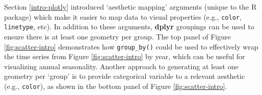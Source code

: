 \documentclass[
  12pt,
]{krantz}
\newenvironment{Shaded}{\begin{snugshade}}{\end{snugshade}}
\newcommand{\CommentTok}[1]{\textcolor[rgb]{0.56,0.35,0.01}{\textit{#1}}}
\newcommand{\DataTypeTok}[1]{\textcolor[rgb]{0.13,0.29,0.53}{#1}}
\newcommand{\KeywordTok}[1]{\textcolor[rgb]{0.13,0.29,0.53}{\textbf{#1}}}
\newcommand{\NormalTok}[1]{#1}
\newcommand{\OperatorTok}[1]{\textcolor[rgb]{0.81,0.36,0.00}{\textbf{#1}}}
\newcommand{\StringTok}[1]{\textcolor[rgb]{0.31,0.60,0.02}{#1}}
\begin{document}
Section \ref{intro-plotly} introduced `aesthetic mapping' arguments (unique to the R package) which make it easier to map data to visual properties (e.g., \texttt{color}, \texttt{linetype}, etc). In addition to these arguments, \textbf{dplyr} groupings can be used to ensure there is at least one geometry per group. The top panel of Figure \ref{fig:scatter-intro} demonstrates how \texttt{group\_by()} could be used to effectively wrap the time series from Figure \ref{fig:scatter-intro} by year, which can be useful for visualizing annual seasonality. Another approach to generating at least one geometry per `group' is to provide categorical variable to a relevant aesthetic (e.g., \texttt{color}), as shown in the bottom panel of Figure \ref{fig:scatter-intro}.


\begin{Shaded}
\end{Shaded}
\end{document}
